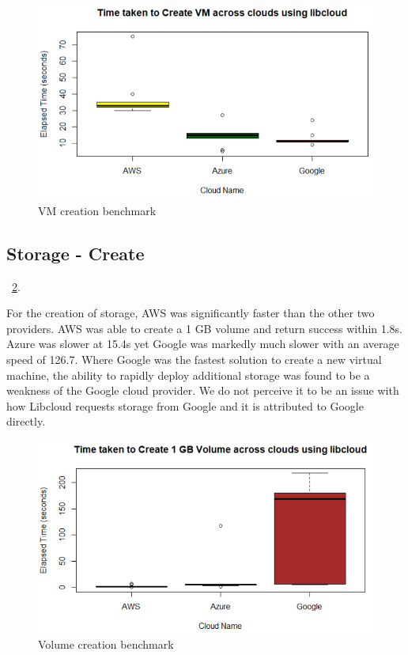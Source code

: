 \begin{figure}[!ht]
  \centering
  \includegraphics[width=\columnwidth]{images/CreateVM.png}
  \caption{VM creation benchmark}\label{F:vm-create}
\end{figure}

\subsection{Storage - Create}~\ref{F:vm-volume}.

For the creation of storage, AWS was significantly faster than the other two
providers. AWS was able to create a 1 GB volume and return success within 1.8s.
Azure was slower at 15.4s yet Google was markedly much slower with an average
speed of 126.7. Where Google was the fastest solution to create a new virtual
machine, the ability to rapidly deploy additional storage was found to be a
weakness of the Google cloud provider. We do not perceive it to be an issue
with how Libcloud requests storage from Google and it is attributed to Google
directly.

\begin{figure}[!ht]
  \centering
  \includegraphics[width=\columnwidth]{images/Create1GBVol.png}
  \caption{Volume creation benchmark}\label{F:vm-volume}
\end{figure}

